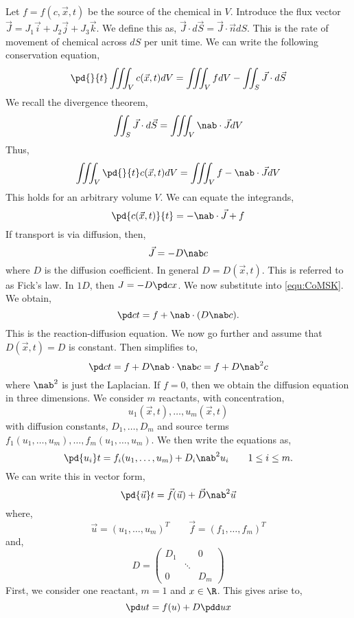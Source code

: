\noindent
Let $f = f(c, \vec x, t)$ be the source of the chemical in $V$. Introduce the flux vector $\vec J = J_1\vec i + J_2\vec j + J_3\vec k$. We define this as, $\vec J \cdot d\vec S = \vec J \cdot \vec n dS$. This is the rate of movement of chemical across $dS$ per unit time. We can write the following conservation equation,
$$ \pd{}{t} \iiint_V c(\vec x, t) dV = \iiint_V fdV - \iint_S \vec J \cdot d\vec S $$
We recall the divergence theorem,
$$ \iint_S \vec J \cdot d\vec S = \iiint_V \nab \cdot \vec J dV $$
Thus,
$$ \iiint_V \pd{}{t} c(\vec x, t) dV = \iiint_V f - \nab \cdot \vec J dV $$
This holds for an arbitrary volume $V$. We can equate the integrands,
\begin{equation}
  \pd {c(\vec x, t)}{t} = -\nab \cdot \vec J + f \label{equ:CoMSK}
\end{equation}
If transport is via diffusion, then,
$$ \vec J = -D\nab c $$
where $D$ is the diffusion coefficient. In general $D = D(\vec x, t)$. This is referred to as Fick's law. In $1D$, then $J = -D\pd c x$. We now substitute into \ref{equ:CoMSK}. We obtain,
\begin{equation}
  \pd c t = f + \nab \cdot (D \nab c).\label{equ:RD}
\end{equation}
This is the reaction-diffusion equation. We now go further and assume that $D(\vec x, t) = D$ is constant. Then  simplifies to,
\begin{equation}
  \pd c t = f + D\nab \cdot \nab c = f + D\nab^2 c\label{equ:simpRD}
\end{equation}
where $\nab^2$ is just the Laplacian. If $f = 0$, then we obtain the diffusion equation in three dimensions. We consider $m$ reactants, with concentration,
$$ u_1(\vec x, t), \dots, u_m(\vec x, t) $$
with diffusion constants, $ D_1, \dots, D_m$ and source terms $f_1(u_1, \dots, u_m), \dots, f_m(u_1, \dots, u_m)$. We then write the equations as,
$$ \pd {u_i} t = f_i(u_1, \dots, u_m) + D_i \nab^2 u_i \qquad 1 \le i \le m. $$
We can write this in vector form,
$$ \pd {\vec u} t = \vec f(\vec u) + \vec D\nab^2 \vec u $$
where,
$$ \vec u = (u_1, \dots, u_m)^T \qquad \vec f = (f_1, \dots, f_m)^T $$
and,
$$ D = \begin{pmatrix}
  D_1 & & 0 \\
  & \ddots & \\
  0 & & D_m
\end{pmatrix} $$
First, we consider one reactant, $m = 1$ and $x \in \R$. This gives arise to,
$$ \pd u t = f(u) + D\pdd u x $$